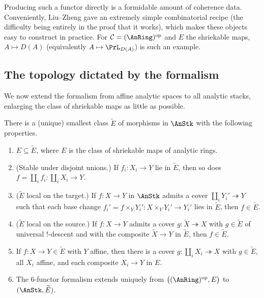 Producing such a functor directly is a formidable amount of coherence data.
Conveniently, Liu--Zheng gave an extremely simple combinatorial recipe (the
difficulty being entirely in the proof that it works), which makes these objects
easy to construct in practice. For $\mathcal C=(\AnRing)^{\mathrm{op}}$ and $E$
the shriekable maps, $A\mapsto D(A)$ (equivalently $A\mapsto\PrL_{D(A)}$) is such
an example.

\subsection{The topology dictated by the formalism}
\label{subsec:21:topology}

We now extend the formalism from affine analytic spaces to all analytic stacks,
enlarging the class of shriekable maps as little as possible.

\begin{theorem}
\label{thm:21:minimal-class}
There is a (unique) smallest class $\widetilde E$ of morphisms in $\AnStk$ with
the following properties.
\begin{enumerate}
\item $E\subseteq\widetilde E$, where $E$ is the class of shriekable maps of
analytic rings.
\item \textup{(Stable under disjoint unions.)} If $f_i\colon X_i\to Y$ lie in
$\widetilde E$, then so does $f=\coprod_i f_i\colon\coprod_i X_i\to Y$.
\item \textup{($\widetilde E$ local on the target.)} If $f\colon X\to Y$ in
$\AnStk$ admits a cover $\coprod_i Y_i'\twoheadrightarrow Y$ such that each base
change $f_i'=f\times_Y Y_i'\colon X\times_Y Y_i'\to Y_i'$ lies in $\widetilde E$,
then $f\in\widetilde E$.
\item \textup{($\widetilde E$ local on the source.)} If $f\colon X\to Y$ admits a
cover $g\colon\widetilde X\twoheadrightarrow X$ with $g\in\widetilde E$ of
universal $!$-descent and with the composite $\widetilde X\to Y$ in
$\widetilde E$, then $f\in\widetilde E$.
\item If $f\colon X\to Y\in\widetilde E$ with $Y$ affine, then there is a cover
$g\colon\coprod_i X_i\twoheadrightarrow X$ with $g\in\widetilde E$, all $X_i$
affine, and each composite $X_i\to Y$ in $E$.
\item The $6$-functor formalism extends uniquely from
$\bigl((\AnRing)^{\mathrm{op}},E\bigr)$ to $(\AnStk,\widetilde E)$.
\end{enumerate}
\end{theorem}

